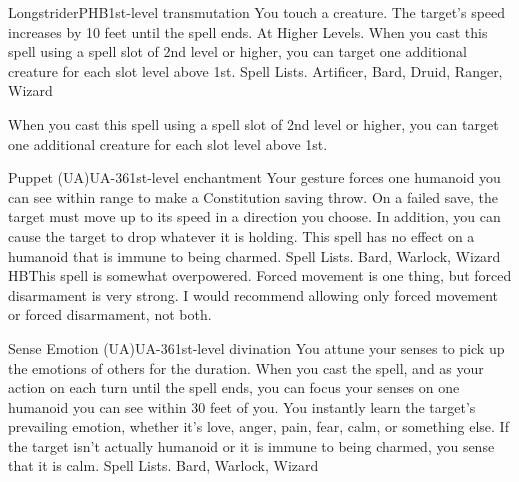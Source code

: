 \begin{spell}{Longstrider}{PHB}{1st-level transmutation}
{
}
You touch a creature. The target’s speed increases by 10 feet until the spell ends.
At Higher Levels. When you cast this spell using a spell slot of 2nd level or higher, you can target one additional creature for each slot level above 1st.
Spell Lists. Artificer, Bard, Druid, Ranger, Wizard

 When you cast this spell using a spell slot of 2nd level or higher, you can target one additional creature for each slot level above 1st.
\end{spell}

\begin{spell}{Puppet (UA)}{UA-36}{1st-level enchantment}
{
}
Your gesture forces one humanoid you can see within range to make a Constitution saving throw. On a failed save, the target must move up to its speed in a direction you choose. In addition, you can cause the target to drop whatever it is holding. This spell has no effect on a humanoid that is immune to being charmed.
Spell Lists. Bard, Warlock, Wizard
HBThis spell is somewhat overpowered. Forced movement is one thing, but forced disarmament is very strong. I would recommend allowing only forced movement or forced disarmament, not both.
\end{spell}

\begin{spell}{Sense Emotion (UA)}{UA-36}{1st-level divination}
{
}
You attune your senses to pick up the emotions of others for the duration. When you cast the spell, and as your action on each turn until the spell ends, you can focus your senses on one humanoid you can see within 30 feet of you. You instantly learn the target’s prevailing emotion, whether it’s love, anger, pain, fear, calm, or something else. If the target isn’t actually humanoid or it is immune to being charmed, you sense that it is calm.
Spell Lists. Bard, Warlock, Wizard
\end{spell}

